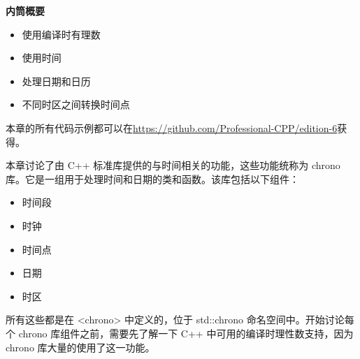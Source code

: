 \noindent
\textbf{内筒概要}

\begin{itemize}
\item
使用编译时有理数

\item
使用时间

\item
处理日期和日历

\item
不同时区之间转换时间点
\end{itemize}

本章的所有代码示例都可以在\url{https://github.com/Professional-CPP/edition-6}获得。

本章讨论了由 C++ 标准库提供的与时间相关的功能，这些功能统称为 chrono 库。它是一组用于处理时间和日期的类和函数。该库包括以下组件：

\begin{itemize}
\item
时间段

\item
时钟

\item
时间点

\item
日期

\item
时区
\end{itemize}

所有这些都是在 <chrono> 中定义的，位于 std::chrono 命名空间中。开始讨论每个 chrono 库组件之前，需要先了解一下 C++ 中可用的编译时理性数支持，因为 chrono 库大量的使用了这一功能。

